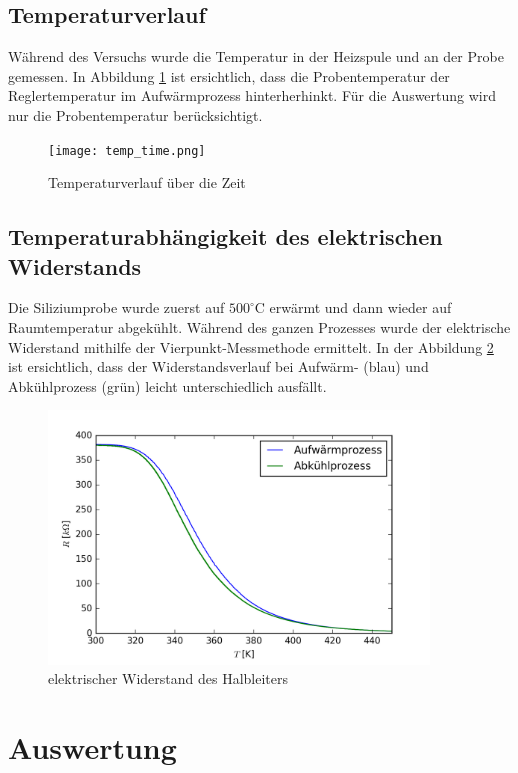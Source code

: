 \documentclass[a4paper,parskip,11pt, DIV12]{scrreprt}
\begin{document}
\section{Temperaturverlauf}
Während des Versuchs wurde die Temperatur in der Heizspule und an der Probe gemessen. In Abbildung \ref{temp_time} ist ersichtlich, dass die Probentemperatur der Reglertemperatur im Aufwärmprozess hinterherhinkt. Für die Auswertung wird nur die Probentemperatur berücksichtigt.
%
\begin{figure}[htbp]
\centering
\texttt{[image: temp\_time.png]}
\caption{Temperaturverlauf über die Zeit}
\label{temp_time}
\end{figure}
%

\clearpage

\section{Temperaturabhängigkeit des elektrischen Widerstands}
Die Siliziumprobe wurde zuerst auf $500^{\circ}$C erwärmt und dann wieder auf Raumtemperatur abgekühlt. Während des ganzen Prozesses wurde der elektrische Widerstand mithilfe der Vierpunkt-Messmethode ermittelt. In der Abbildung \ref{res_temp} ist ersichtlich, dass der Widerstandsverlauf bei Aufwärm- (blau) und Abkühlprozess (grün) leicht unterschiedlich ausfällt.
%
\begin{figure}[htbp]
\centering
\includegraphics[width=0.9\textwidth]{res_temp.png}
\caption{elektrischer Widerstand des Halbleiters}
\label{res_temp}
\end{figure}
%


\chapter{Auswertung}
\end{document}
